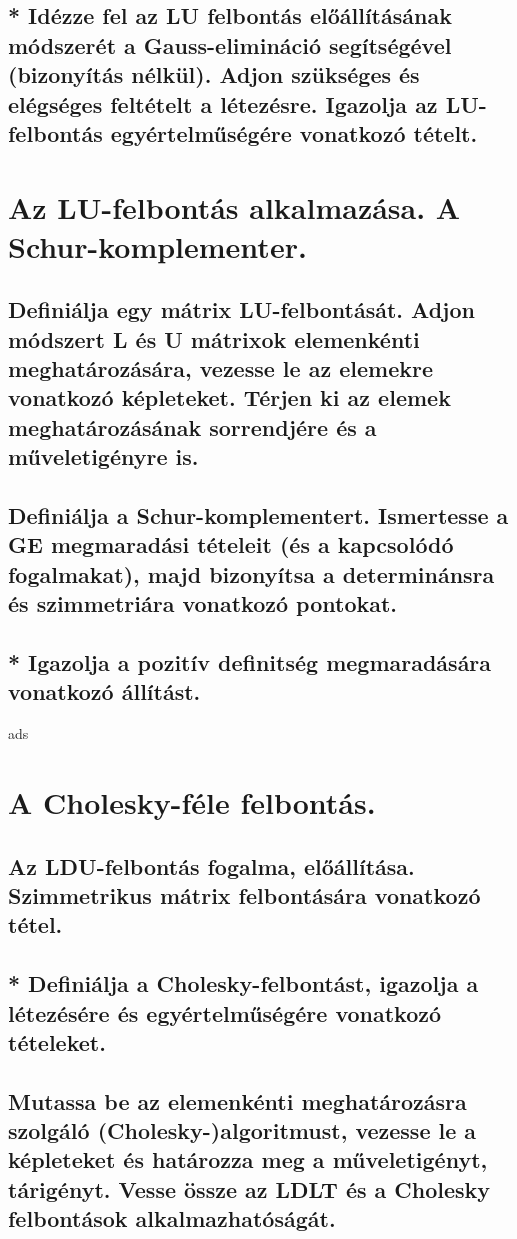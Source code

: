 \documentclass{article}
\begin{document}
        \subsection{* Idézze fel az LU felbontás előállításának módszerét a Gauss-elimináció segítségével (bizonyítás nélkül). Adjon szükséges és elégséges feltételt a létezésre. Igazolja az LU-felbontás egyértelműségére vonatkozó tételt.}


    \section{Az LU-felbontás alkalmazása. A Schur-komplementer.}
        \subsection{Definiálja egy mátrix LU-felbontását. Adjon módszert L és U mátrixok elemenkénti meghatározására, vezesse le az elemekre vonatkozó képleteket. Térjen ki az elemek meghatározásának sorrendjére és a műveletigényre is.}
        \subsection{Definiálja a Schur-komplementert. Ismertesse a GE megmaradási tételeit (és a kapcsolódó fogalmakat), majd bizonyítsa a determinánsra és szimmetriára vonatkozó pontokat.}
        \subsection{* Igazolja a pozitív definitség megmaradására vonatkozó állítást.}
    
ads
    \section{A Cholesky-féle felbontás.}
        \subsection{Az LDU-felbontás fogalma, előállítása. Szimmetrikus mátrix felbontására vonatkozó tétel.}
        \subsection{* Definiálja a Cholesky-felbontást, igazolja a létezésére és egyértelműségére vonatkozó tételeket.}
        \subsection{Mutassa be az elemenkénti meghatározásra szolgáló (Cholesky-)algoritmust, vezesse le a képleteket és határozza meg a műveletigényt, tárigényt. Vesse össze az LDLT és a Cholesky felbontások alkalmazhatóságát.}
\end{document}
